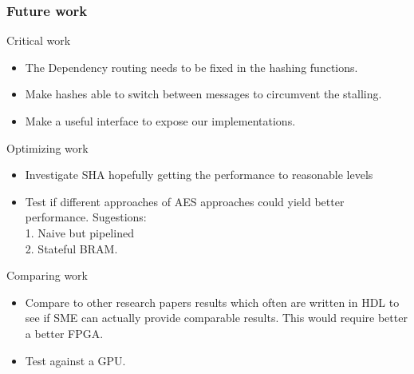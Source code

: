 \begin{frame}
  \frametitle{Future work}
  \fontsize{8pt}{10}\selectfont
  Critical work
  \begin{itemize}
    \item The Dependency routing needs to be fixed in the hashing functions.
  \item Make hashes able to switch between messages to circumvent the stalling.
  \item Make a useful interface to expose our implementations.
  \end{itemize}
  Optimizing work
  \begin{itemize}
    \item Investigate SHA hopefully getting the performance to reasonable levels
    \item Test if different approaches of AES approaches could yield better performance.
          Sugestions:\\
          1. Naive but pipelined\\
          2. Stateful BRAM.
  \end{itemize}
  Comparing work
  \begin{itemize}
    \item Compare to other research papers results which often are written in HDL to see if SME can actually provide comparable results. This would require better a better FPGA.
    \item Test against a GPU.
  \end{itemize}
\end{frame}
